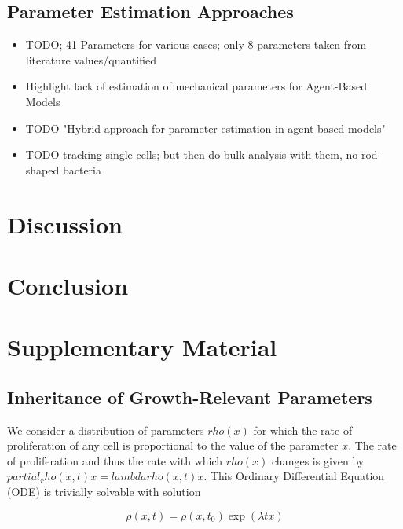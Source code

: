 \documentclass{article}
\begin{document}
\subsection{Parameter Estimation Approaches}

\begin{itemize}
    \item \cite{Storck2014} TODO; 41 Parameters for various cases; only 8 parameters taken from
        literature values/quantified
    \item Highlight lack of estimation of mechanical parameters for Agent-Based Models
    \item \cite{Gallaher2017} TODO "Hybrid approach for parameter estimation in agent-based models"
    \item \cite{Nguyen2024} TODO tracking single cells; but then do bulk analysis with them, no
        rod-shaped bacteria
\end{itemize}

\section{Discussion}
\section{Conclusion}




\renewcommand{\thesection}{}
\renewcommand{\thesubsection}{S\arabic{subsection}}

\section{Supplementary Material}
\subsection{Inheritance of Growth-Relevant Parameters}

We consider a distribution of parameters $rho(x)$ for
which the rate of proliferation of any cell is proportional to the value of the parameter $x$.
The rate of proliferation and thus the rate with which $rho(x)$ changes is given by
$partial_rho(x,t) x = lambda rho(x,t) x$.
This Ordinary Differential Equation (ODE) is trivially solvable with solution

\begin{equation}
    \rho(x,t) = \rho(x,t_0) \exp(\lambda t x)
\end{equation}
\end{document}
